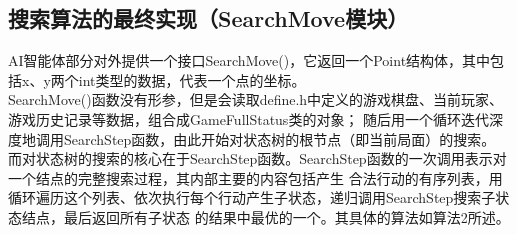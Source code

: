 \documentclass{acm_proc_article-sp}
\begin{document}
\subsection{\textbf{搜索算法的最终实现（SearchMove模块）}}
AI智能体部分对外提供一个接口SearchMove()，它返回一个Point结构体，其中包括x、y两个int类型的数据，代表一个点的坐标。\\
SearchMove()函数没有形参，但是会读取define.h中定义的游戏棋盘、当前玩家、游戏历史记录等数据，组合成GameFullStatus类的对象；
随后用一个循环迭代深度地调用SearchStep函数，由此开始对状态树的根节点（即当前局面）的搜索。\\
而对状态树的搜索的核心在于SearchStep函数。SearchStep函数的一次调用表示对一个结点的完整搜索过程，其内部主要的内容包括产生
合法行动的有序列表，用循环遍历这个列表、依次执行每个行动产生子状态，递归调用SearchStep搜索子状态结点，最后返回所有子状态
的结果中最优的一个。其具体的算法如算法2所述。\\
\end{document}

